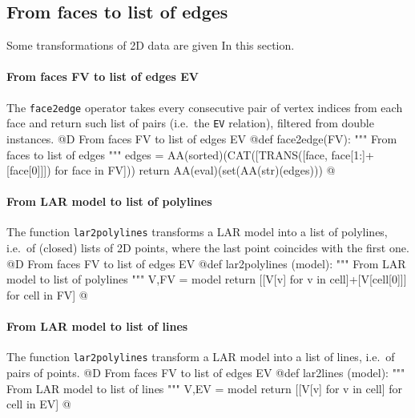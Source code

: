 \documentclass[11pt,oneside]{article}    %
\begin{document}
\subsection{From faces to list of edges}

Some transformations of 2D data are given In this section. 

\paragraph{From faces FV to list of edges EV}
The \texttt{face2edge} operator takes every consecutive pair of vertex indices from each face and return such list of pairs (i.e.~the \texttt{EV} relation), filtered from double instances.
@D From faces FV to list of edges EV
@{def face2edge(FV):
    """ From faces to list of edges """
    edges = AA(sorted)(CAT([TRANS([face, face[1:]+[face[0]]]) for face in FV]))
    return AA(eval)(set(AA(str)(edges)))
@}

\paragraph{From LAR model to list of polylines}
The function \texttt{lar2polylines}
transforms a LAR model into a list of polylines, i.e.~of (closed) lists of 2D points, where the last point coincides with the first one.
@D From faces FV to list of edges EV
@{def lar2polylines (model):
    """ From LAR model to list of polylines """
    V,FV = model
    return [[V[v] for v in cell]+[V[cell[0]]] for cell in FV]
@}

\paragraph{From LAR model to list of lines}
The function \texttt{lar2polylines}
transform a LAR model into a list of lines, i.e.~of pairs of points.
@D From faces FV to list of edges EV
@{def lar2lines (model):
    """ From LAR model to list of lines """
    V,EV = model
    return [[V[v] for v in cell] for cell in EV]
@}
\end{document}
